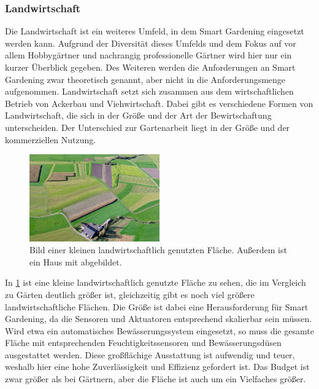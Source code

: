 
\subsubsection{Landwirtschaft}
Die Landwirtschaft ist ein weiteres Umfeld, in dem Smart Gardening eingesetzt werden kann.
Aufgrund der Diversität dieses Umfelds und dem Fokus auf vor allem Hobbygärtner und nachrangig professionelle Gärtner wird hier nur ein kurzer Überblick gegeben.
Des Weiteren werden die Anforderungen an Smart Gardening zwar theoretisch genannt, aber nicht in die Anforderungsmenge aufgenommen.
Landwirtschaft setzt sich zusammen aus dem wirtschaftlichen Betrieb von Ackerbau und Viehwirtschaft.
Dabei gibt es verschiedene Formen von Landwirtschaft, die sich in der Größe und der Art der Bewirtschaftung unterscheiden.
Der Unterschied zur Gartenarbeit liegt in der Größe und der kommerziellen Nutzung.

\begin{figure}[!ht]
	\centering
	\includegraphics[width=0.5\textwidth]{images/Landwirtschaft.jpg}
	\caption[Bild einer kleinen landwirtschaftlich genutzten Fläche.]{
		Bild einer kleinen landwirtschaftlich genutzten Fläche.
		Außerdem ist ein Haus mit abgebildet.\footnotemark
	}
	\label{pic:landwirtschaft}
\end{figure}

In \cref{pic:landwirtschaft} ist eine kleine landwirtschaftlich genutzte Fläche zu sehen, die im Vergleich zu Gärten deutlich größer ist, gleichzeitig gibt es noch viel größere landwirtschaftliche Flächen.
Die Größe ist dabei eine Herausforderung für Smart Gardening, da die Sensoren und Aktuatoren entsprechend skalierbar sein müssen.
Wird etwa ein automatisches Bewässerungssystem eingesetzt, so muss die gesamte Fläche mit entsprechenden Feuchtigkeitssensoren und Bewässerungsdüsen ausgestattet werden.
Diese großflächige Ausstattung ist aufwendig und teuer, weshalb hier eine hohe Zuverlässigkeit und Effizienz gefordert ist.
Das Budget ist zwar größer als bei Gärtnern, aber die Fläche ist auch um ein Vielfaches größer.

